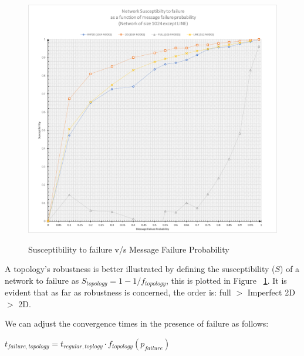 \documentclass[a4paper, 10pt]{article}
\begin{document}
    \begin{figure}[h]
      \caption{Susceptibility to failure v/s Message Failure Probability}
      \includegraphics[width=\textwidth]{project2_bonus_susceptibility}
      \label{fig:susceptibility}
    \end{figure}

    A topology's robustness is better illustrated by defining the susceptibility ($S$) of a network to failure as $S_{topology} = 1 - 1/f_{topology}$, this is plotted in Figure ~\ref{fig:susceptibility}. It is evident that as far as robustness is concerned, the order is: full $>$ Imperfect 2D $>$ 2D.

    We can adjust the convergence times in the presence of failure as follows:

    $t_{failure, topology} = t_{regular, toplogy} \cdot f_{topology}(p_{failure})$
\end{document}
